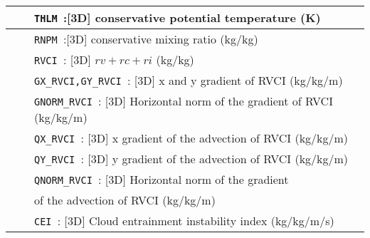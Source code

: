 \begin{center}
\begin{makeimage}
\begin{tabular}{|>{\centering}p{3cm}|>{\centering}p{2.5cm}|p{11cm}|}
& & {\tt THLM }:[3D] conservative potential temperature (K)\\\cline{3-3}
& & {\tt RNPM }:[3D] conservative mixing ratio (kg/kg)\\\cline{3-3}
&& {\tt RVCI }: [3D] $rv+rc+ri$ (kg/kg)\\\cline{3-3}
& & {\tt GX\_RVCI,GY\_RVCI }: [3D] x and y gradient of RVCI (kg/kg/m) \\\cline{3-3}
& &{\tt GNORM\_RVCI }: [3D] Horizontal norm of the gradient of RVCI (kg/kg/m) \\\cline{3-3}
& &{\tt QX\_RVCI }: [3D] x  gradient of the advection of RVCI (kg/kg/m)  \\\cline{3-3}
& &{\tt QY\_RVCI }: [3D] y gradient of the advection of RVCI (kg/kg/m)  \\\cline{3-3}

& &{\tt QNORM\_RVCI }: [3D] Horizontal norm of the gradient\\
& &  of the advection of RVCI (kg/kg/m)  \\\cline{3-3}
& &{\tt CEI }: [3D] Cloud entrainment instability index (kg/kg/m/s) \\ \hline
\end{tabular} 
\end{makeimage}
\end{center}
\newpage
